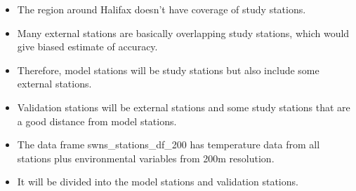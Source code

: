 \documentclass[]{article}
\providecommand{\tightlist}{%
  \setlength{\itemsep}{0pt}\setlength{\parskip}{0pt}}
\begin{document}
\begin{itemize}
\tightlist
\item
  The region around Halifax doesn't have coverage of study stations.
\item
  Many external stations are basically overlapping study stations, which
  would give biased estimate of accuracy.
\item
  Therefore, model stations will be study stations but also include some
  external stations.
\item
  Validation stations will be external stations and some study stations
  that are a good distance from model stations.
\item
  The data frame swns\_stations\_df\_200 has temperature data from all
  stations plus environmental variables from 200m resolution.
\item
  It will be divided into the model stations and validation stations.
\end{itemize}
\end{document}
